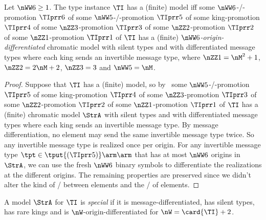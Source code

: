 \begin{remark}\label{rem:diff-msg-tp}
Let $\nWW6\geq1$.
The type instance $\TI$ has a (finite) model
iff some $\nWW6$-\twotype/-promotion $\TIprr6$
of some $\nWW5$-\twotype/-promotion $\TIprr5$
of some king-promotion $\TIprr4$
of some $\nZZ3$-promotion $\TIprr3$
of some $\nZZ2$-promotion $\TIprr2$
of some $\nZZ1$-promotion $\TIprr1$ 
of $\TI$ has a (finite) \emph{$\nWW6$-origin-differentiated} chromatic model
with silent types and with differentiated message types 
where each king sends an invertible message type,
where $\nZZ1 = \nM^2+1$, $\nZZ2 = 2\nM+2$, $\nZZ3 = 3$ and $\nWW5 = \nM$.
\end{remark}
\begin{proof}
Suppose that $\TI$ has a (finite) model, so by~
some $\nWW5$-\twotype/-promotion $\TIprr5$
of some king-promotion $\TIprr4$
of some $\nZZ3$-promotion $\TIprr3$
of some $\nZZ2$-promotion $\TIprr2$
of some $\nZZ1$-promotion $\TIprr1$ 
of $\TI$ has a (finite) chromatic model $\StrA$ with silent types and with
differentiated message types where each king sends an invertible message type.
By message differentiation, no element may send the same invertible message type
twice.
So any invertible message type is realized once per origin.
For any invertible message type $\tpt\in\tput{(\TIprr5)}\arm\arm$ that has at
most $\nWW6$ origins in $\StrA$, we can use the fresh $\nWW6$ binary symbols to
differentiate the realizations at the different origins.
The remaining properties are preserved since we didn't alter the kind of
\twotypes/ between elements and the \onetypes/ of elements.
\end{proof}

\begin{definition}
A model $\StrA$ for $\TI$ is \emph{special} if it is message-differentiated, has
silent types, has rare kings and is $\nW$-origin-differentiated for $\nW =
\card{\TI}+2$.
\end{definition}